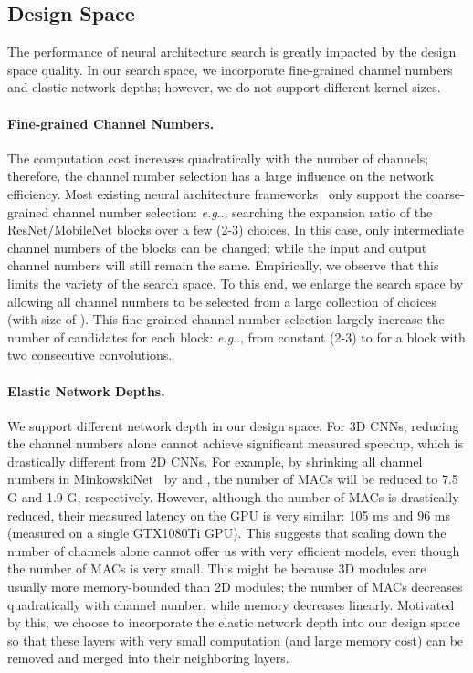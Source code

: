 \documentclass[runningheads]{llncs}
\makeatletter
\DeclareRobustCommand\onedot{\futurelet\@let@token\@onedot}
\def\@onedot{\ifx\@let@token.\else.\null\fi\xspace}
\def\eg{\emph{e.g}\onedot} \def\Eg{\emph{E.g}\onedot}
\makeatother
\begin{document}
\subsection{Design Space}

The performance of neural architecture search is greatly impacted by the design space quality. In our search space, we incorporate fine-grained channel numbers and elastic network depths; however, we do not support different kernel sizes.

\paragraph{Fine-grained Channel Numbers.}

The computation cost increases quadratically with the number of channels; therefore, the channel number selection has a large influence on the network efficiency. Most existing neural architecture frameworks~\cite{cai2019proxylessnas} only support the coarse-grained channel number selection: \eg, searching the expansion ratio of the ResNet/MobileNet blocks over a few (2-3) choices. In this case, only intermediate channel numbers of the blocks can be changed; while the input and output channel numbers will still remain the same. Empirically, we observe that this limits the variety of the search space. To this end, we enlarge the search space by allowing all channel numbers to be selected from a large collection of choices (with size of ). This fine-grained channel number selection largely increase the number of candidates for each block: \eg, from constant (2-3) to  for a block with two consecutive convolutions.

\paragraph{Elastic Network Depths.}

We support different network depth in our design space. For 3D CNNs, reducing the channel numbers alone cannot achieve significant measured speedup, which is drastically different from 2D CNNs. For example, by shrinking all channel numbers in MinkowskiNet~\cite{choy20194d} by  and , the number of MACs will be reduced to 7.5 G and 1.9 G, respectively. However, although the number of MACs is drastically reduced, their measured latency on the GPU is very similar: 105 ms and 96 ms (measured on a single GTX1080Ti GPU). This suggests that scaling down the number of channels alone cannot offer us with very efficient models, even though the number of MACs is very small. This might be because 3D modules are usually more memory-bounded than 2D modules; the number of MACs decreases quadratically with channel number, while memory decreases linearly. Motivated by this, we choose to incorporate the elastic network depth into our design space so that these layers with very small computation (and large memory cost) can be removed and merged into their neighboring layers.
\end{document}
